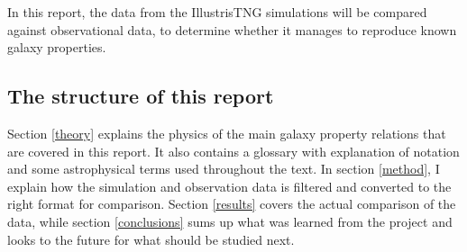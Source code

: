 In this report, the data from the IllustrisTNG simulations will be compared against observational data, to determine whether it manages to reproduce known galaxy properties.


\subsection{The structure of this report}
Section \ref{theory} explains the physics of the main galaxy property relations that are covered in this report. It also contains a glossary with explanation of notation and some astrophysical terms used throughout the text. In section \ref{method}, I explain how the simulation and observation data is filtered and converted to the right format for comparison. Section \ref{results} covers the actual comparison of the data, while section \ref{conclusions} sums up what was learned from the project and looks to the future for what should be studied next.